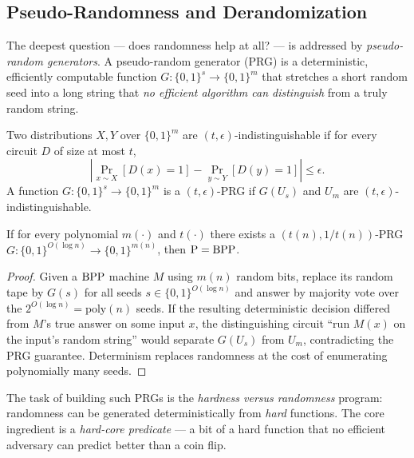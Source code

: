 \subsection{Pseudo-Randomness and Derandomization}
\label{sec:randomized:pseudorandom}

The deepest question --- does randomness help at all? --- is addressed by \emph{pseudo-random generators}. A pseudo-random generator (PRG) is a deterministic, efficiently computable function $G: \{0,1\}^s \to \{0,1\}^m$ that stretches a short random seed into a long string that \emph{no efficient algorithm can distinguish} from a truly random string.

\begin{definition}
Two distributions $X, Y$ over $\{0,1\}^m$ are $(t, \epsilon)$-indistinguishable if for every circuit $D$ of size at most $t$,
\[
\left|\Pr_{x \sim X}[D(x) = 1] - \Pr_{y \sim Y}[D(y) = 1]\right| \le \epsilon.
\]
A function $G: \{0,1\}^s \to \{0,1\}^m$ is a $(t,\epsilon)$-PRG if $G(U_s)$ and $U_m$ are $(t, \epsilon)$-indistinguishable.
\end{definition}

\begin{theorem}
If for every polynomial $m(\cdot)$ and $t(\cdot)$ there exists a $(t(n), 1/t(n))$-PRG $G: \{0,1\}^{O(\log n)} \to \{0,1\}^{m(n)}$, then $\text{P} = \text{BPP}$.
\end{theorem}

\begin{proof}
Given a $\text{BPP}$ machine $M$ using $m(n)$ random bits, replace its random tape by $G(s)$ for all seeds $s \in \{0,1\}^{O(\log n)}$ and answer by majority vote over the $2^{O(\log n)} = \mathrm{poly}(n)$ seeds. If the resulting deterministic decision differed from $M$'s true answer on some input $x$, the distinguishing circuit ``run $M(x)$ on the input's random string'' would separate $G(U_s)$ from $U_m$, contradicting the PRG guarantee. Determinism replaces randomness at the cost of enumerating polynomially many seeds.
\end{proof}

The task of building such PRGs is the \emph{hardness versus randomness} program: randomness can be generated deterministically from \emph{hard} functions. The core ingredient is a \emph{hard-core predicate} --- a bit of a hard function that no efficient adversary can predict better than a coin flip.

